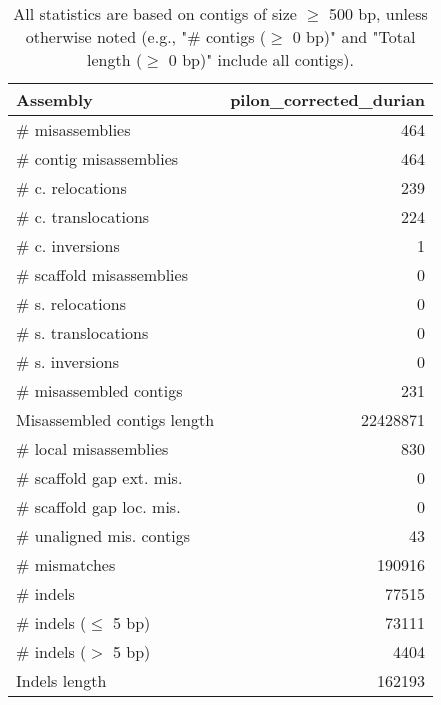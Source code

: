 \documentclass[12pt,a4paper]{article}
\begin{document}
\begin{table}[ht]
\begin{center}
\caption{All statistics are based on contigs of size $\geq$ 500 bp, unless otherwise noted (e.g., "\# contigs ($\geq$ 0 bp)" and "Total length ($\geq$ 0 bp)" include all contigs).}
\begin{tabular}{|l*{1}{|r}|}
\hline
Assembly & pilon\_corrected\_durian \\ \hline
\# misassemblies & 464 \\ \hline
\hspace{2mm}\# contig misassemblies & 464 \\ \hline
\hspace{5mm}\# c. relocations & 239 \\ \hline
\hspace{5mm}\# c. translocations & 224 \\ \hline
\hspace{5mm}\# c. inversions & 1 \\ \hline
\hspace{2mm}\# scaffold misassemblies & 0 \\ \hline
\hspace{5mm}\# s. relocations & 0 \\ \hline
\hspace{5mm}\# s. translocations & 0 \\ \hline
\hspace{5mm}\# s. inversions & 0 \\ \hline
\# misassembled contigs & 231 \\ \hline
Misassembled contigs length & 22428871 \\ \hline
\# local misassemblies & 830 \\ \hline
\# scaffold gap ext. mis. & 0 \\ \hline
\# scaffold gap loc. mis. & 0 \\ \hline
\# unaligned mis. contigs & 43 \\ \hline
\# mismatches & 190916 \\ \hline
\# indels & 77515 \\ \hline
\hspace{5mm}\# indels ($\leq$ 5 bp) & 73111 \\ \hline
\hspace{5mm}\# indels ($>$ 5 bp) & 4404 \\ \hline
Indels length & 162193 \\ \hline
\end{tabular}
\end{center}
\end{table}
\end{document}
